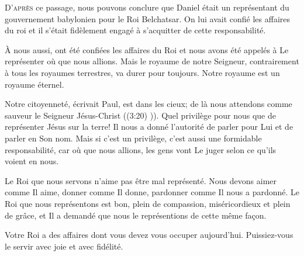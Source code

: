 

\lettrine{D}{'après} ce passage,
 nous pouvons conclure que Daniel était un représentant du gouvernement
 babylonien pour le Roi Belchatsar. On lui avait confié
 les affaires du roi et il s'était fidèlement engagé
 à s'acquitter de cette responsabilité. 

À nous aussi, ont été confiées les affaires du Roi et nous avons été appelés
 à Le représenter où que nous allions. Mais le royaume de notre Seigneur,
 contrairement à tous les royaumes terrestres, 
 va durer pour toujours.  Notre royaume est un royaume éternel. 


\Og Notre citoyenneté, écrivait Paul, 
 est dans les cieux; de là nous attendons comme sauveur
 le Seigneur Jésus-Christ \Fg{} ((3:20) \NBS)).
 Quel privilège pour nous que de représenter Jésus sur la terre!
 Il nous a donné l'autorité de parler pour Lui et de parler en Son nom.
 Mais si c'est un privilège, c'est aussi une formidable responsabilité,
 car où que nous allions, les gens vont Le juger selon ce qu'ils voient en nous. 

Le Roi que nous servons n'aime pas être mal représenté.
 Nous devons aimer comme Il aime, donner comme Il donne, pardonner
 comme Il nous a pardonné. Le Roi que nous représentons est bon,
 plein de compassion, miséricordieux et plein de grâce,
 et Il a demandé que nous le représentions de cette même fa\c{c}on. 

Votre Roi a des affaires dont vous devez vous occuper aujourd'hui.
 Puissiez-vous le servir avec joie et avec fidélité. 

\dvrule





